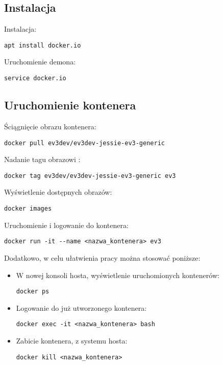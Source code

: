 \documentclass{article}
\begin{document}
\subsection{Instalacja}
Instalacja: 
\begin{lstlisting}
apt install docker.io
\end{lstlisting}
Uruchomienie demona: 
\begin{lstlisting}
service docker.io
\end{lstlisting}


\subsection{Uruchomienie kontenera}
Ściągnięcie obrazu kontenera\cite{docker-library}\cite{ev3}: 
\begin{lstlisting}
docker pull ev3dev/ev3dev-jessie-ev3-generic
\end{lstlisting}
Nadanie tagu obrazowi : 
\begin{lstlisting}
docker tag ev3dev/ev3dev-jessie-ev3-generic ev3
\end{lstlisting}
Wyświetlenie dostępnych obrazów: 
\begin{lstlisting}
docker images
\end{lstlisting}
Uruchomienie i logowanie do kontenera: 
\begin{lstlisting}
docker run -it --name <nazwa_kontenera> ev3
\end{lstlisting}
Dodatkowo, w celu ułatwienia pracy można stosować poniższe:
\begin{itemize}
\item W nowej konsoli hosta, wyświetlenie uruchomionych kontenerów: 
\begin{lstlisting}
docker ps
\end{lstlisting}
\item Logowanie do już utworzonego kontenera: 
\begin{lstlisting}
docker exec -it <nazwa_kontenera> bash
\end{lstlisting}
\item Zabicie kontenera, z systemu hosta: 
\begin{lstlisting}
docker kill <nazwa_kontenera>
\end{lstlisting}
\end{itemize}
\end{document}
